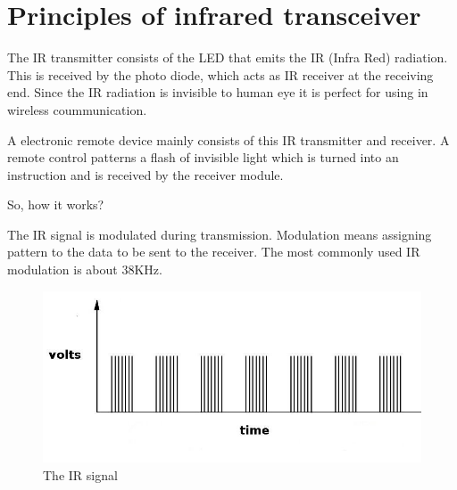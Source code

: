 \documentclass[a4paper]{report}
\begin{document}
    \section{Principles of infrared transceiver}
        The IR transmitter consists of the LED that emits the IR (Infra Red) radiation. 
        This is received by the photo diode, which acts as IR receiver at the receiving end. 
        Since the IR radiation is invisible to human eye it is perfect for using in wireless coummunication. 
        \linebreak
        \par A electronic remote device mainly consists of this IR transmitter and receiver. 
        A remote control patterns a flash of invisible light which is turned into an instruction 
        and is received by the receiver module.
        \linebreak
        \par So, how it works?
        \linebreak
        \par The IR signal is modulated during transmission. Modulation means assigning pattern to the 
        data to be sent to the receiver. The most commonly used IR modulation is about 38KHz. \\
        \begin{figure}[ht]
            \centering 
            \includegraphics[width=\linewidth]{pic.jpeg}
            \caption{\label{fig:boat}The IR signal}
        \end{figure}
\end{document}
